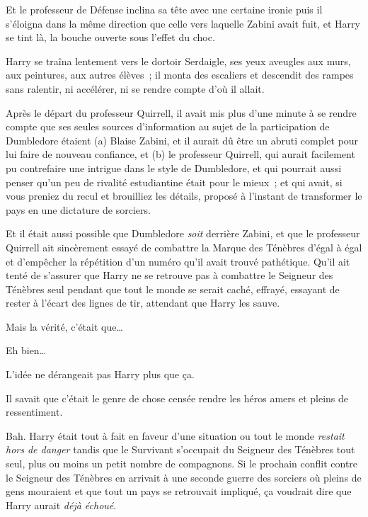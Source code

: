 Et le professeur de Défense inclina sa tête avec une certaine ironie puis il s'éloigna dans la même direction que celle vers laquelle Zabini avait fuit, et Harry se tint là, la bouche ouverte sous l'effet du choc.


Harry se traîna lentement vers le dortoir Serdaigle, ses yeux aveugles aux murs, aux peintures, aux autres élèves~; il monta des escaliers et descendit des rampes sans ralentir, ni accélérer, ni se rendre compte d'où il allait.

Après le départ du professeur Quirrell, il avait mis plus d'une minute à se rendre compte que ses seules sources d'information au sujet de la participation de Dumbledore étaient (a) Blaise Zabini, et il aurait dû être un abruti complet pour lui faire de nouveau confiance, et (b) le professeur Quirrell, qui aurait facilement pu contrefaire une intrigue dans le style de Dumbledore, et qui pourrait aussi penser qu'un peu de rivalité estudiantine était pour le mieux~; et qui avait, si vous preniez du recul et brouilliez les détails, proposé à l'instant de transformer le pays en une dictature de sorciers.

Et il était aussi possible que Dumbledore \emph{soit} derrière Zabini, et que le professeur Quirrell ait sincèrement essayé de combattre la Marque des Ténèbres d'égal à égal et d'empêcher la répétition d'un numéro qu'il avait trouvé pathétique. Qu'il ait tenté de s'assurer que Harry ne se retrouve pas à combattre le Seigneur des Ténèbres seul pendant que tout le monde se serait caché, effrayé, essayant de rester à l'écart des lignes de tir, attendant que Harry les sauve.

Mais la vérité, c'était que…

Eh bien…

L'idée ne dérangeait pas Harry plus que ça.

Il savait que c'était le genre de chose censée rendre les héros amers et pleins de ressentiment.

Bah. Harry était tout à fait en faveur d'une situation ou tout le monde \emph{restait hors de danger} tandis que le Survivant s'occupait du Seigneur des Ténèbres tout seul, plus ou moins un petit nombre de compagnons. Si le prochain conflit contre le Seigneur des Ténèbres en arrivait à une seconde guerre des sorciers où pleins de gens mouraient et que tout un pays se retrouvait impliqué, ça voudrait dire que Harry aurait \emph{déjà échoué}.

